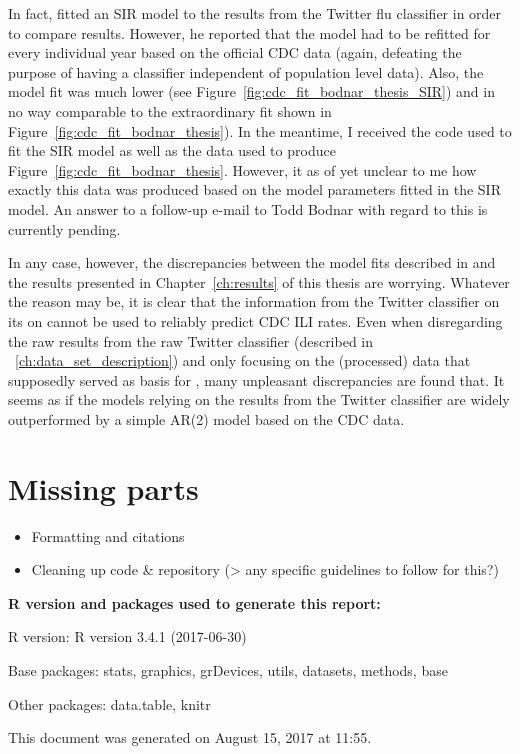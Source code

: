 \documentclass[11pt, a4paper,twoside]{report}\usepackage[]{graphicx}\usepackage[]{color}
\newcommand{\prog}[1]{\textsf{#1}}
\begin{document}
In fact, \citep{bodnar_data_2015} fitted an SIR model to the results from the Twitter flu classifier in order to compare results. However, he reported that the model had to be refitted for every individual year based on the official CDC data (again, defeating the purpose of having a classifier independent of population level data). Also, the model fit was much lower (see Figure~\ref{fig:cdc_fit_bodnar_thesis_SIR}) and in no way comparable to the extraordinary fit shown in Figure~\ref{fig:cdc_fit_bodnar_thesis}). In the meantime, I received the code used to fit the SIR model as well as the data used to produce Figure~\ref{fig:cdc_fit_bodnar_thesis}. However, it as of yet unclear to me how exactly this data was produced based on the model parameters fitted in the SIR model. An answer to a follow-up e-mail to Todd Bodnar with regard to this is currently pending.

In any case, however, the discrepancies between the model fits described in \citep{bodnar_data_2015} and the results presented in Chapter~\ref{ch:results} of this thesis are worrying. Whatever the reason may be, it is clear that the information from the Twitter classifier on its on cannot be used to reliably predict CDC ILI rates. Even when disregarding the raw results from the raw Twitter classifier (described in ~\ref{ch:data_set_description}) and only focusing on the (processed) data that supposedly served as basis for \citep{bodnar_data_2015}, many unpleasant discrepancies are found that. It seems as if the models relying on the results from the Twitter classifier are widely outperformed by a simple AR(2) model based on the CDC data.

\section{Missing parts}

\begin{itemize}
\item Formatting and citations
\item Cleaning up code \& repository (> any specific guidelines to follow for this?)
\end{itemize}

\newpage



\newpage
{}


%

\vfill

\footnotesize

{\bf \prog{R} version and packages used to generate this report:}

\prog{R} version: \textsf{R version 3.4.1 (2017-06-30)}

Base packages: \textsf{stats, graphics, grDevices, utils, datasets, methods, base}

Other packages: \textsf{data.table, knitr}

This document was generated on August 15, 2017 at 11:55.
\end{document}
